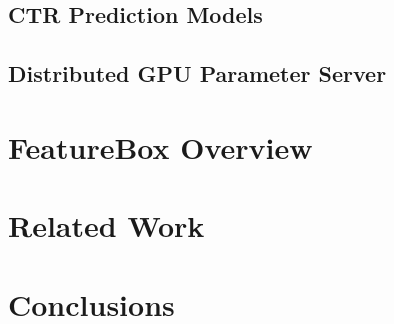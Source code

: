 \documentclass[conference]{IEEEtran}
\begin{document}
\subsection{CTR Prediction Models}

\subsection{Distributed GPU Parameter Server}

\section{FeatureBox Overview}



\section{Related Work}

\section{Conclusions}



%
\end{document}
